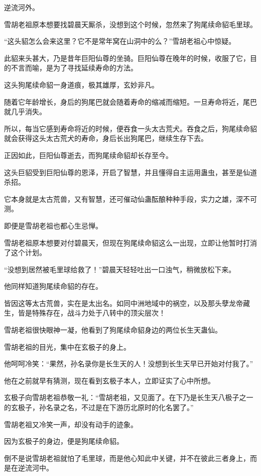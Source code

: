 
\begin{this_body}

逆流河外。

雪胡老祖原本想要找碧晨天厮杀，没想到这个时候，忽然来了狗尾续命貂毛里球。

“这头貂怎么会来这里？它不是常年窝在山洞中的么？”雪胡老祖心中惊疑。

此貂来头甚大，乃是昔年巨阳仙尊的坐骑。巨阳仙尊在晚年的时候，收服了它，目的不言而喻，是为了寻找延续寿命的方法。

这头狗尾续命貂一身道痕，极其雄厚，玄妙非凡。

随着它年龄增长，身后的狗尾巴就会随着寿命的缩减而缩短。一旦寿命将近，尾巴就几乎消失。

所以，每当它感到寿命将近的时候，便吞食一头太古荒犬。吞食之后，狗尾续命貂就会获得这头太古荒犬的寿命，身后长出狗尾巴，继续生存下去。

正因如此，巨阳仙尊逝去，而狗尾续命貂却长存至今。

这头巨貂受到巨阳仙尊的恩泽，开启了智慧，并且懂得自主运用蛊虫，甚至是仙道杀招。

它本身就是太古荒兽，又有智慧，还可催动仙蛊酝酿种种手段，实力之雄，深不可测。

即便是雪胡老祖也都心生忌惮。

雪胡老祖原本想要对付碧晨天，但现在狗尾续命貂这么一出现，立即让他暂时打消了这个计划。

“没想到居然被毛里球给救了！”碧晨天轻轻吐出一口浊气，稍微放松下来。

他同样知道狗尾续命貂的存在。

皆因这等太古荒兽，实在是太出名。如同中洲地域中的祸空，以及那头孽龙帝藏生，皆是特殊存在，战斗力处于八转中的顶尖层次！

雪胡老祖很快眼神一凝，他看到了狗尾续命貂身边的两位长生天蛊仙。

雪胡老祖的目光，集中在玄极子的身上。

他呵呵冷笑：“果然，孙名录你是长生天的人！没想到长生天早已开始对付我了。”

他在之前就早有猜测，现在看到玄极子本人，立即证实了心中所想。

玄极子向雪胡老祖恭敬一礼：“雪胡老祖，又见面了。在下乃是长生天八极子之一的玄极子，孙名录之名，不过是在下游历北原时的化名罢了。”

雪胡老祖又冷笑一声，却没有动手的迹象。

因为玄极子的身边，便是狗尾续命貂。

倒不是说雪胡老祖就怕了毛里球，而是他心知此中关键，并不在彼此三者身上，而是在逆流河中。


\end{this_body}
